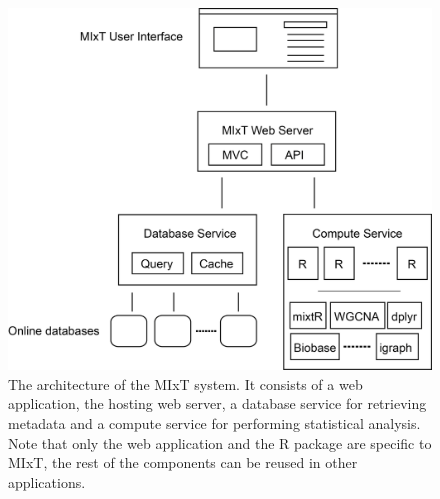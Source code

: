 \begin{figure}[h!]
\centering
\includegraphics[scale=0.4]{figures/mixt-architecture.png}
\caption{The architecture of the MIxT system. It consists of
a web application, the hosting web server, a database service for retrieving
metadata and a compute service for performing statistical analysis. Note that
only the web application and the R package are specific to MIxT, the rest of the
components can be reused in other applications.} 
\label{kvik-mixt}
\end{figure} 

